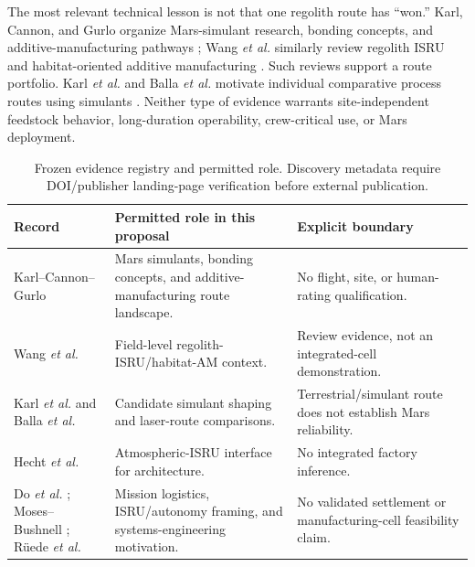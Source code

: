 \documentclass[conference]{../../../../Conference-LaTeX-template_10-17-19/IEEEtran}
\begin{document}
The most relevant technical lesson is not that one regolith route has ``won.'' Karl, Cannon, and Gurlo organize Mars-simulant research, bonding concepts, and additive-manufacturing pathways \cite{karl_cannon_gurlo_2021}; Wang \emph{et al.} similarly review regolith ISRU and habitat-oriented additive manufacturing \cite{wang_etal_2022}. Such reviews support a route portfolio. Karl \emph{et al.} and Balla \emph{et al.} motivate individual comparative process routes using simulants \cite{karl_etal_2020,balla_etal_2012}. Neither type of evidence warrants site-independent feedstock behavior, long-duration operability, crew-critical use, or Mars deployment.

\begin{table}[!t]
\caption{Frozen evidence registry and permitted role. Discovery metadata require DOI/publisher landing-page verification before external publication.}
\label{tab:evidence}
\centering
\small
\begin{tabularx}{\textwidth}{lY Y}
\toprule
Record & Permitted role in this proposal & Explicit boundary \\
\midrule
Karl--Cannon--Gurlo \cite{karl_cannon_gurlo_2021} & Mars simulants, bonding concepts, and additive-manufacturing route landscape. & No flight, site, or human-rating qualification. \\
Wang \emph{et al.} \cite{wang_etal_2022} & Field-level regolith-ISRU/habitat-AM context. & Review evidence, not an integrated-cell demonstration. \\
Karl \emph{et al.} \cite{karl_etal_2020} and Balla \emph{et al.} \cite{balla_etal_2012} & Candidate simulant shaping and laser-route comparisons. & Terrestrial/simulant route does not establish Mars reliability. \\
Hecht \emph{et al.} \cite{hecht_etal_2020} & Atmospheric-ISRU interface for architecture. & No integrated factory inference. \\
Do \emph{et al.} \cite{do_etal_2016}; Moses--Bushnell \cite{moses_bushnell_2016}; Rüede \emph{et al.} \cite{ruede_etal_2019} & Mission logistics, ISRU/autonomy framing, and systems-engineering motivation. & No validated settlement or manufacturing-cell feasibility claim. \\
\bottomrule
\end{tabularx}
\end{table}
\end{document}
